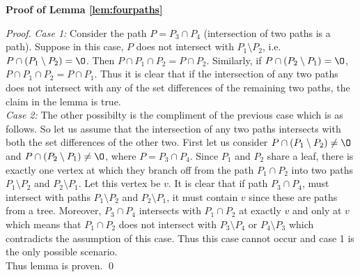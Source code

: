 \documentclass{fsttcs}
\begin{document}
\noindent
{\bf Proof of Lemma \ref{lem:fourpaths}}\\
\begin{proof}
  {\em Case 1:} Consider the path $P = P_3 \cap P_4$ (intersection of
  two paths is a path).
  Suppose in this case, $P$ does not intersect with $P_1 \setminus
  P_2$, i.e. $P \cap (P_1 \setminus P_2) = \O$. Then $P \cap P_1 \cap
  P_2 = P \cap P_2$. Similarly, if $P \cap (P_2 \setminus P_1) = \O$,
  $P \cap P_1 \cap P_2 = P \cap P_1$. Thus it is clear that if the
  intersection of any two paths does not intersect with any of the set
  differences of
  the remaining two paths, the claim in the lemma is true.\\
  {\em Case 2:} The other possibilty is the compliment of the previous
  case which is as follows. So let us assume that the intersection of
  any two paths intersects with both the set differences of the other
  two. First let us consider $P \cap (P_1 \setminus P_2) \ne \O$ and
  $P \cap (P_2 \setminus P_1) \ne \O$, where $P = P_3 \cap P_4$. Since
  $P_1$ and $P_2$ share a leaf, there is exactly one vertex at which
  they branch off from the path $P_1 \cap P_2$ into two paths $P_1
  \setminus P_2$ and $P_2 \setminus P_1$. Let this vertex be $v$. It
  is clear that if path $P_3 \cap P_4$, must intersect with paths $P_1
  \setminus P_2$ and $P_2 \setminus P_1$, it must contain $v$ since
  these are paths from a tree. Moreover, $P_3 \cap P_4$ intersects
  with $P_1 \cap P_2$ at exactly $v$ and only at $v$ which means that
  $P_1 \cap P_2$ does not intersect with $P_3 \setminus P_4$ or $P_4
  \setminus P_3$ which contradicts the assumption of this case. Thus
  this  case cannot occur and case 1 is the only possible scenario. \\
  Thus lemma is proven. \qed
\end{proof}
\end{document}
